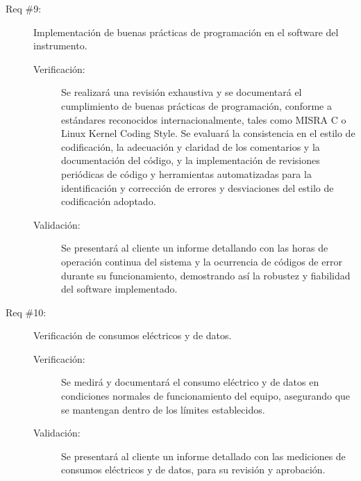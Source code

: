 \begin{description}
\item [Req \#9:] Implementación de buenas prácticas de programación en el software del instrumento.

\begin{description}
	\item [Verificación:] Se realizará una revisión exhaustiva y se documentará el cumplimiento de buenas prácticas de programación, conforme a estándares reconocidos internacionalmente, tales como MISRA C o Linux Kernel Coding Style. Se evaluará la consistencia en el estilo de codificación, la adecuación y claridad de los comentarios y la documentación del código, y la implementación de revisiones periódicas de código y herramientas automatizadas para la identificación y corrección de errores y desviaciones del estilo de codificación adoptado.
	\item [Validación:] Se presentará al cliente un informe detallando con las horas de operación continua del sistema y la ocurrencia de códigos de error durante su funcionamiento, demostrando así la robustez y fiabilidad del software implementado.
\end{description}

\item [Req \#10:] Verificación de consumos eléctricos y de datos.

\begin{description}
	\item [Verificación:] Se medirá y documentará el consumo eléctrico y de datos en condiciones normales de funcionamiento del equipo, asegurando que se mantengan dentro de los límites establecidos.
	\item [Validación:] Se presentará al cliente un informe detallado con las mediciones de consumos eléctricos y de datos, para su revisión y aprobación.
\end{description}








\end{description}

